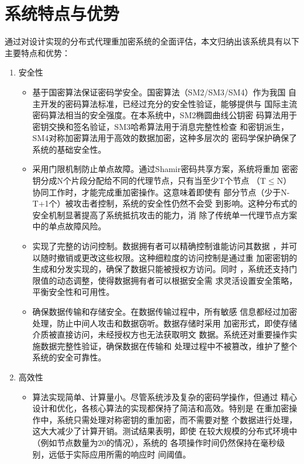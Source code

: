 \section{系统特点与优势}

通过对设计实现的分布式代理重加密系统的全面评估，本文归纳出该系统具有以下主要特点和优势：

\begin{enumerate}
	\item 安全性
	      \begin{itemize}
		      \item 基于国密算法保证密码学安全。国密算法（SM2/SM3/SM4）作为我国
		            自主开发的密码算法标准，已经过充分的安全性验证，能够提供与
		            国际主流密码算法相当的安全强度。在本系统中，SM2椭圆曲线公钥密
		            码算法用于密钥交换和签名验证，SM3哈希算法用于消息完整性检查
		            和密钥派生，SM4对称加密算法用于高效的数据加密，这种多层次的
		            密码学保护确保了系统的基础安全性。

		      \item 采用门限机制防止单点故障。通过Shamir密码共享方案，系统将重加
		            密密钥分成N个片段分配给不同的代理节点，只有当至少T个节点
		            （T$\leq$N）协同工作时，才能完成重加密操作。这意味着即使有
		            部分节点（少于N-T+1个）被攻击者控制，系统的安全性仍然不会受
		            到影响。这种分布式的安全机制显著提高了系统抵抗攻击的能力，消
		            除了传统单一代理节点方案中的单点故障风险。

		      \item 实现了完整的访问控制。数据拥有者可以精确控制谁能访问其数据
		            ，并可以随时撤销或更改这些权限。这种细粒度的访问控制是通过重
		            加密密钥的生成和分发实现的，确保了数据只能被授权方访问。同时
		            ，系统还支持门限值的动态调整，使得数据拥有者可以根据安全需
		            求灵活设置安全策略，平衡安全性和可用性。

		      \item 确保数据传输和存储安全。在数据传输过程中，所有敏感
		            信息都经过加密处理，防止中间人攻击和数据窃听。数据存储时采用
		            加密形式，即使存储介质被直接访问，未经授权方也无法获取明文
		            数据。系统还对重要操作实施数据完整性验证，确保数据在传输和
		            处理过程中不被篡改，维护了整个系统的安全可靠性。
	      \end{itemize}

	\item 高效性
	      \begin{itemize}
		      \item 算法实现简单、计算量小。尽管系统涉及复杂的密码学操作，但通过
		            精心设计和优化，各核心算法的实现都保持了简洁和高效。特别是
		            在重加密操作中，系统只需处理对称密钥的重加密，而不需要对整
		            个数据进行处理，这大大减少了计算开销。测试结果表明，即使
		            在较大规模的分布式环境中（例如节点数量为20的情况），系统的
		            各项操作时间仍然保持在毫秒级别，远低于实际应用所需的响应时
		            间阈值。


\end{itemize}
\end{enumerate}
